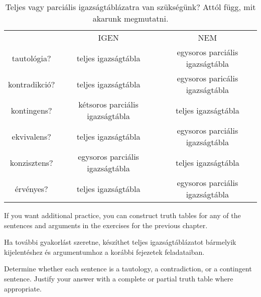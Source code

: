 \begin{table}[h!]
\begin{center}
\begin{tabular}{c|c|c|}
\cline{2-3}
 & IGEN & NEM\\
\cline{2-3}
tautológia? & teljes igazságtábla & egysoros parciális igazságtábla\\
kontradikció? &  teljes igazságtábla  & egysoros paricális igazságtábla\\
kontingens? & kétsoros parciális igazságtábla & teljes igazságtábla\\
ekvivalens? & teljes igazságtábla & egysoros parciális igazságtábla\\
konzisztens? & egysoros parciális igazságtábla & teljes igazságtábla\\
érvényes? & teljes igazságtábla & egysoros parciális igazságtábla\\
\cline{2-3}
\end{tabular}
\end{center}
\caption{Teljes vagy parciális igazságtáblázatra van szükségünk? Attól függ, mit akarunk
megmutatni.}
\label{table.CompleteVsPartial}
\end{table}

 








\practiceproblems
If you want additional practice, you can construct truth tables for any of the sentences and arguments in the exercises for the previous chapter.

\practiceproblems
Ha további gyakorlást szeretne, készíthet teljes igazságtáblázatot bármelyik kijelentéshez és argumentumhoz a korábbi fejezetek feladataiban.

\solutions
\problempart
\label{pr.TT.TTorC}
Determine whether each sentence is a tautology, a contradiction, or a contingent sentence. Justify your answer with a complete or partial truth table where appropriate.

